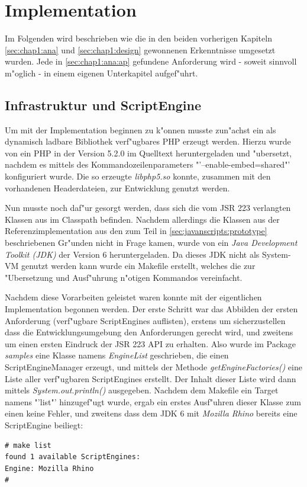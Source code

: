 
\section{Implementation}
\label{sec:chap1:impl}

Im Folgenden wird beschrieben wie die in den beiden vorherigen Kapiteln \ref{sec:chap1:ana} und \ref{sec:chap1:design}
gewonnenen Erkenntnisse umgesetzt wurden. Jede in \ref{sec:chap1:ana:ap} gefundene Anforderung wird - soweit sinnvoll
m"oglich - in einem eigenen Unterkapitel aufgef"uhrt.

\subsection{Infrastruktur und ScriptEngine}
\label{sec:chap1:impl:1}

Um mit der Implementation beginnen zu k"onnen musste zun"achst ein als dynamisch ladbare Bibliothek verf"ugbares
PHP erzeugt werden. Hierzu wurde von \cite{PHPHP} ein PHP in der Version 5.2.0 im Quelltext heruntergeladen und 
"ubersetzt, nachdem es mittels des Kommandozeilenparameters "'--enable-embed=shared"' konfiguriert wurde. Die so
erzeugte \emph{libphp5.so} konnte, zusammen mit den vorhandenen Headerdateien, zur Entwicklung genutzt werden.

Nun musste noch daf"ur gesorgt werden, dass sich die vom JSR 223 verlangten Klassen aus  im
Classpath befinden. Nachdem allerdings die Klassen aus der Referenzimplementation aus den zum Teil in 
\ref{sec:javanscripts:prototype} beschriebenen Gr"unden nicht in Frage kamen, wurde von \cite{JAVAHP} ein
\emph{Java Development Toolkit (JDK)} der Version 6 heruntergeladen. Da dieses JDK nicht als System-VM genutzt
werden kann wurde ein Makefile erstellt, welches die zur "Ubersetzung und Ausf"uhrung n"otigen Kommandos
vereinfacht.

Nachdem diese Vorarbeiten geleistet waren konnte mit der eigentlichen Implementation begonnen werden.
Der erste Schritt war das Abbilden der ersten Anforderung (verf"ugbare ScriptEngines auflisten), erstens um 
sicherzustellen dass die Entwicklungsumgebung den Anforderungen gerecht wird, und zweitens um einen ersten
Eindruck der JSR 223 API zu erhalten. Also wurde im Package \emph{samples} eine Klasse namens
\emph{EngineList} geschrieben, die einen ScriptEngineManager erzeugt, und mittels der Methode
\emph{getEngineFactories()} eine Liste aller verf"ugbaren ScriptEngines erstellt. Der Inhalt dieser
Liste wird dann mittels \emph{System.out.println()} ausgegeben. 
Nachdem dem Makefile ein Target namens "'list"' hinzugef"ugt wurde, ergab ein erstes Ausf"uhren dieser Klasse
zum einen keine Fehler, und zweitens dass dem JDK 6 mit \emph{Mozilla Rhino} bereits eine ScriptEngine beiliegt:
\begin{lstlisting}[caption=erste Tests]
# make list
found 1 available ScriptEngines:
Engine: Mozilla Rhino
#
\end{lstlisting}

